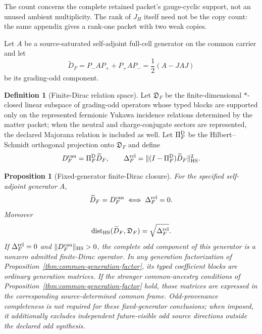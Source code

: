 \documentclass[11pt]{article}
\numberwithin{equation}{section}
\newtheorem{proposition}[theorem]{Proposition}
\theoremstyle{definition}
\newtheorem{definition}[theorem]{Definition}
\theoremstyle{remark}
\newcommand{\HS}{\mathrm{HS}}
\begin{document}
The count concerns the complete retained packet's gauge-cyclic support,
not an unused ambient multiplicity.  The rank of $J_H$ itself need not be
the copy count: the same appendix gives a rank-one packet with two weak copies.

Let $A$ be a source-saturated self-adjoint full-cell generator on the common
carrier and let
\begin{equation}
 \widetilde D_F=P_-AP_+ + P_+AP_-
 =\frac12(A-JAJ)
 \label{eq:finite-dirac}
\end{equation}
be its grading-odd component.

\begin{definition}[Finite-Dirac relation space]
\label{def:finite-dirac-relation-space}
Let $\mathfrak D_F$ be the finite-dimensional $*$-closed linear subspace of
grading-odd operators whose typed blocks are supported only on the represented
fermionic Yukawa incidence relations determined by the matter packet; when the
neutral and charge-conjugate sectors are represented, the declared Majorana
relation is included as well.  Let
$\Pi_F^{\rm D}$ be the Hilbert--Schmidt orthogonal projection onto
$\mathfrak D_F$ and define
\begin{equation}
 D_F^{\rm can}=\Pi_F^{\rm D}\widetilde D_F,
 \qquad
 \Delta_F^{\rm rel}
 =\|(I-\Pi_F^{\rm D})\widetilde D_F\|_{\HS}^2.
 \label{eq:finite-dirac-relation-defect}
\end{equation}
\end{definition}

\begin{proposition}[Fixed-generator finite-Dirac closure]
\label{prop:finite-dirac}
For the specified self-adjoint generator $A$,
\begin{equation}
 \widetilde D_F=D_F^{\rm can}
 \iff \Delta_F^{\rm rel}=0.
 \label{eq:finite-dirac-exact-relation}
\end{equation}
Moreover
\begin{equation}
 \operatorname{dist}_{\HS}(\widetilde D_F,\mathfrak D_F)
 =\sqrt{\Delta_F^{\rm rel}}.
 \label{eq:finite-dirac-distance}
\end{equation}
If $\Delta_F^{\rm rel}=0$ and $\|D_F^{\rm can}\|_{\HS}>0$, the complete odd
component of this generator is a nonzero admitted finite-Dirac operator.  In
any generation factorization of
Proposition~\ref{thm:common-generation-factor}, its typed coefficient
blocks are ordinary generation matrices.  If the stronger common-ancestry
conditions of Proposition~\ref{thm:common-generation-factor} hold, those matrices
are expressed in the corresponding source-determined common frame.
Odd-provenance completeness is not required for these fixed-generator
conclusions; when imposed, it additionally excludes independent future-visible
odd source directions outside the declared odd synthesis.
\end{proposition}
\end{document}
